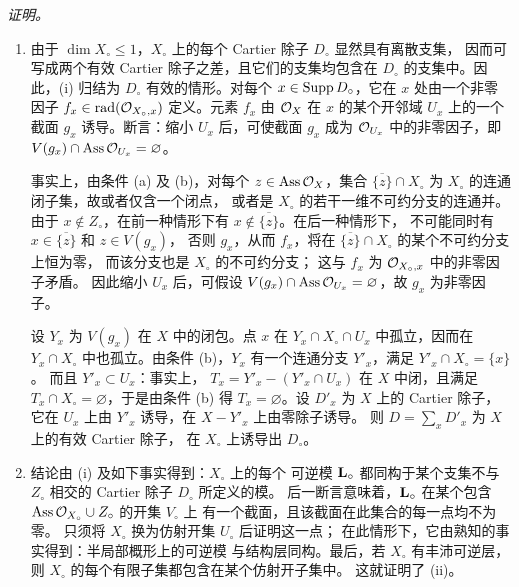 \noindent
\emph{证明。}
\begin{enumerate}
\renewcommand{\theenumi}{\roman{enumi}}
\renewcommand{\labelenumi}{(\theenumi)}
\item 由于 $\dim X_{\circ}\leq1$，$X_{\circ}$ 上的每个
Cartier 除子 $D_{\circ}$ 显然具有离散支集，
因而可写成两个有效 Cartier 除子之差，且它们的支集均包含在
$D_{\circ}$ 的支集中。因此，(i) 归结为
$D_{\circ}$ 有效的情形。对每个
$x\in\operatorname{Supp} D_{\circ}$，它在 $x$ 处由一个非零因子
$f_x\in\operatorname{rad}({\mathcal O}_{X_{\circ},x})$ 定义。元素 $f_x$
由 ${\mathcal O}_X$ 在 $x$ 的某个开邻域 $U_x$ 上的一个截面
$g_x$ 诱导。断言：缩小 $U_x$ 后，可使截面
$g_x$ 成为 ${\mathcal O}_{U_x}$ 中的非零因子，即
$V(g_x)\cap\operatorname{Ass}{\mathcal O}_{U_x}=\varnothing$。

事实上，由条件 (a) 及 (b)，对每个
$z\in\operatorname{Ass}{\mathcal O}_X$，集合 $\overline{\{z\}}\cap X_{\circ}$
为 $X_{\circ}$ 的连通闭子集，故或者仅含一个闭点，
或者是 $X_{\circ}$ 的若干一维不可约分支的连通并。
由于 $x\notin Z_{\circ}$，在前一种情形下有
$x\notin\overline{\{z\}}$。在后一种情形下，
不可能同时有 $x\in\overline{\{z\}}$ 和 $z\in V(g_x)$，
否则 $g_x$，从而 $f_x$，将在
$\overline{\{z\}}\cap X_{\circ}$ 的某个不可约分支上恒为零，
而该分支也是 $X_{\circ}$ 的不可约分支；
这与 $f_x$ 为 ${\mathcal O}_{X_{\circ},x}$ 中的非零因子矛盾。
因此缩小 $U_x$ 后，可\pageoriginale 假设
$V(g_x)\cap\operatorname{Ass}{\mathcal O}_{U_x}=\varnothing$，故 $g_x$ 为非零因子。

设 $Y_x$ 为 $V(g_x)$ 在 $X$ 中的闭包。点 $x$ 在
$Y_x\cap X_{\circ}\cap U_x$ 中孤立，因而在
$Y_x\cap X_{\circ}$ 中也孤立。由条件 (b)，$Y_x$
有一个连通分支 $Y'_x$，满足 $Y'_x\cap X_{\circ}=\{x\}$。
而且 $Y'_x\subset U_x$：事实上，
$T_x=Y'_x-(Y'_x\cap U_x)$ 在 $X$ 中闭，且满足
$T_x\cap X_{\circ}=\varnothing$，于是由条件 (b) 得
$T_x=\varnothing$。设 $D'_x$ 为 $X$ 上的 Cartier 除子，
它在 $U_x$ 上由 $Y'_x$ 诱导，在 $X-Y'_x$ 上由零除子诱导。
则 $D=\sum_xD'_x$ 为 $X$ 上的有效 Cartier 除子，
在 $X_{\circ}$ 上诱导出 $D_{\circ}$。

\item 结论由 (i) 及如下事实得到：$X_{\circ}$ 上的每个
可逆模 $\mathbf{L}_{\circ}$ 都同构于某个支集不与
$Z_{\circ}$ 相交的 Cartier 除子 $D_{\circ}$ 所定义的模。
后一断言意味着，$\mathbf{L}_{\circ}$ 在某个包含
$\operatorname{Ass}{\mathcal O}_{X_{\circ}}\cup Z_{\circ}$ 的开集 $V_{\circ}$ 上
有一个截面，且该截面在此集合的每一点均不为零。
只须将 $X_{\circ}$ 换为仿射开集 $U_{\circ}$ 后证明这一点；
在此情形下，它由熟知的事实得到：半局部概形上的可逆模
与结构层同构。最后，若 $X_{\circ}$ 有丰沛可逆层，
则 $X_{\circ}$ 的每个有限子集都包含在某个仿射开子集中。
这就证明了 (ii)。
\end{enumerate}

